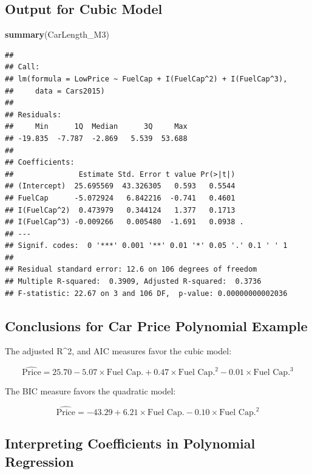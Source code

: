 \documentclass[]{book}
\newenvironment{Shaded}{\begin{snugshade}}{\end{snugshade}}
\newcommand{\KeywordTok}[1]{\textcolor[rgb]{0.13,0.29,0.53}{\textbf{#1}}}
\newcommand{\NormalTok}[1]{#1}
\begin{document}
\subsection{Output for Cubic Model}\label{output-for-cubic-model}

\begin{Shaded}
\begin{Highlighting}[]
\KeywordTok{summary}\NormalTok{(CarLength_M3)}
\end{Highlighting}
\end{Shaded}

\begin{verbatim}
## 
## Call:
## lm(formula = LowPrice ~ FuelCap + I(FuelCap^2) + I(FuelCap^3), 
##     data = Cars2015)
## 
## Residuals:
##     Min      1Q  Median      3Q     Max 
## -19.835  -7.787  -2.869   5.539  53.688 
## 
## Coefficients:
##               Estimate Std. Error t value Pr(>|t|)  
## (Intercept)  25.695569  43.326305   0.593   0.5544  
## FuelCap      -5.072924   6.842216  -0.741   0.4601  
## I(FuelCap^2)  0.473979   0.344124   1.377   0.1713  
## I(FuelCap^3) -0.009266   0.005480  -1.691   0.0938 .
## ---
## Signif. codes:  0 '***' 0.001 '**' 0.01 '*' 0.05 '.' 0.1 ' ' 1
## 
## Residual standard error: 12.6 on 106 degrees of freedom
## Multiple R-squared:  0.3909, Adjusted R-squared:  0.3736 
## F-statistic: 22.67 on 3 and 106 DF,  p-value: 0.00000000002036
\end{verbatim}

\subsection{Conclusions for Car Price Polynomial
Example}\label{conclusions-for-car-price-polynomial-example}

The adjusted R\^{}2, and AIC measures favor the cubic model:

\[
\widehat{\text{Price}} = 25.70 -5.07 \times \text{Fuel Cap.} + 0.47 \times \text{Fuel Cap.}^2 - 0.01 \times \text{Fuel Cap.}^3
\]

The BIC measure favors the quadratic model:

\[
\widehat{\text{Price}} = -43.29 + 6.21 \times \text{Fuel Cap.} - 0.10 \times \text{Fuel Cap.}^2
\]

\subsection{Interpreting Coefficients in Polynomial
Regression}\label{interpreting-coefficients-in-polynomial-regression}
\end{document}
